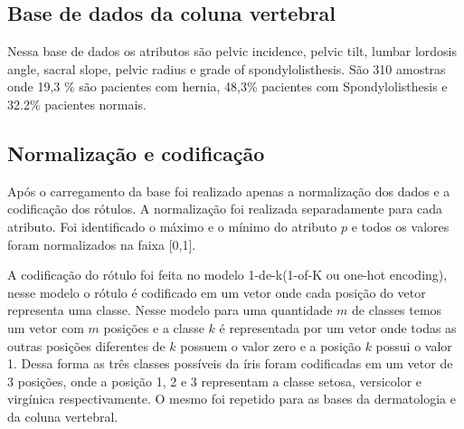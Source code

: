 \documentclass[ 
	article,			%
	11pt,				%
	oneside,			%
	a4paper,			%
	english,			%
	brazil,				%
	]{abntex2}
\begin{document}
\subsection{Base de dados da coluna vertebral}

Nessa base de dados os atributos são pelvic incidence, pelvic tilt, lumbar
lordosis angle, sacral slope, pelvic radius e grade of spondylolisthesis.
São 310 amostras onde 19,3 \% são pacientes com hernia, 48,3\% pacientes com
Spondylolisthesis e 32.2\% pacientes normais.

\subsection{Normalização e codificação}
\label{ss:normCodf} 
Após o carregamento da base foi realizado apenas a normalização dos dados e a
codificação dos rótulos. A normalização foi realizada separadamente para cada
atributo. Foi identificado o máximo e o mínimo do atributo $p$ e todos os
valores foram normalizados na faixa [0,1].

A codificação do rótulo foi feita no modelo 1-de-k(1-of-K ou one-hot encoding),
nesse modelo o rótulo é codificado em um vetor onde cada posição do
vetor representa uma classe. Nesse modelo para uma quantidade $m$ de classes
temos um vetor com $m$ posições e a classe $k$ é representada por um vetor
onde todas as outras posições diferentes de $k$ possuem o valor zero e a
posição $k$ possui o valor 1. Dessa forma as três classes possíveis da íris
foram codificadas em um vetor de 3 posições, onde a posição 1, 2 e 3
representam a classe setosa, versicolor e virgínica respectivamente. O mesmo foi
repetido para as bases da dermatologia e da coluna vertebral.
\end{document}
